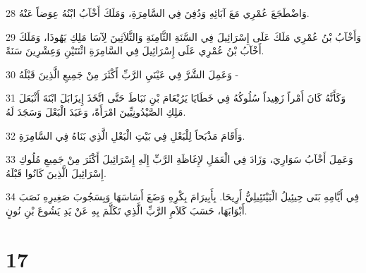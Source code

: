 \par 28 وَاضْطَجَعَ عُمْرِي مَعَ آبَائِهِ وَدُفِنَ فِي السَّامِرَةِ، وَمَلَكَ أَخْآبُ ابْنُهُ عِوَضاً عَنْهُ.
\par 29 وَأَخْآبُ بْنُ عُمْرِي مَلَكَ عَلَى إِسْرَائِيلَ فِي السَّنَةِ الثَّامِنَةِ وَالثَّلاَثِينَ لِآسَا مَلِكِ يَهُوذَا، وَمَلَكَ أَخْآبُ بْنُ عُمْرِي عَلَى إِسْرَائِيلَ فِي السَّامِرَةِ اثْنَتَيْنِ وَعِشْرِينَ سَنَةً.
\par 30 وَعَمِلَ الشَّرَّ فِي عَيْنَيِ الرَّبِّ أَكْثَرَ مِنْ جَمِيعِ الَّذِينَ قَبْلَهُ -
\par 31 وَكَأَنَّهُ كَانَ أَمْراً زَهِيداً سُلُوكُهُ فِي خَطَايَا يَرُبْعَامَ بْنِ نَبَاطَ حَتَّى اتَّخَذَ إِيزَابَلَ ابْنَةَ أَثْبَعَلَ مَلِكِ الصَّيْدُونِيِّينَ امْرَأَةً، وَعَبَدَ الْبَعْلَ وَسَجَدَ لَهُ.
\par 32 وَأَقَامَ مَذْبَحاً لِلْبَعْلِ فِي بَيْتِ الْبَعْلِ الَّذِي بَنَاهُ فِي السَّامِرَةِ.
\par 33 وَعَمِلَ أَخْآبُ سَوَارِيَ، وَزَادَ فِي الْعَمَلِ لإِغَاظَةِ الرَّبِّ إِلَهِ إِسْرَائِيلَ أَكْثَرَ مِنْ جَمِيعِ مُلُوكِ إِسْرَائِيلَ الَّذِينَ كَانُوا قَبْلَهُ.
\par 34 فِي أَيَّامِهِ بَنَى حِيئِيلُ الْبَيْتَئِيلِيُّ أَرِيحَا. بِأَبِيرَامَ بِكْرِهِ وَضَعَ أَسَاسَهَا وَبِسَجُوبَ صَغِيرِهِ نَصَبَ أَبْوَابَهَا، حَسَبَ كَلاَمِ الرَّبِّ الَّذِي تَكَلَّمَ بِهِ عَنْ يَدِ يَشُوعَ بْنِ نُونٍ.

\chapter{17}

